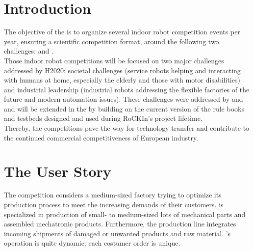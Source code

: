
\section{Introduction}
\label{sec:nutshell-introduction}

The objective of the \erl is to organize several indoor robot competition events per year, ensuring a
scientific competition format, around the following two challenges: \erlsrlong and \erlirlong.\\
Those indoor robot competitions will be focused on two major challenges addressed by H2020: societal
challenges (service robots helping and interacting with humans at home, especially the elderly and
those with motor disabilities) and industrial leadership (industrial robots addressing the flexible factories of the future and modern automation issues). These challenges were addressed by \roah and \roaw and will be extended in the \erl by building on the current version of the
rule books and testbeds designed and used during RoCKIn’s project lifetime.\\
Thereby, the \erl competitions pave the way for technology transfer and contribute to the continued commercial competitiveness of European industry. 

\clearpage
{}
\section{The \erlir User Story}

The \erlir competition considers a medium-sized factory \rollin trying to optimize its production process to meet the increasing demands of their customers. 
\rollin is specialized in production of small- to medium-sized lots of mechanical parts and assembled mechatronic products. 
Furthermore, the \rollin production line integrates incoming shipments of damaged or unwanted products and raw material. 
\rollin's operation is quite dynamic; each costumer order is unique. 


